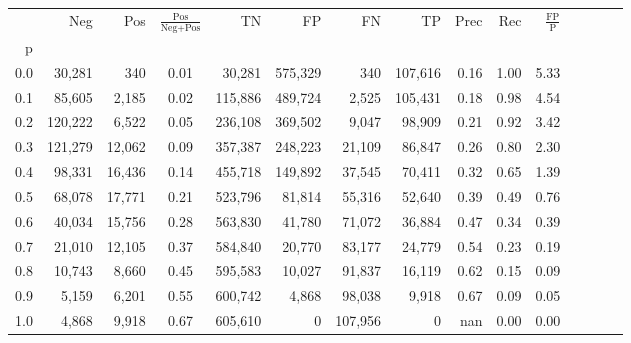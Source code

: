 \begin{tabular}{rrrcrrrrrrrrrrr}
\toprule
{} &      Neg &     Pos & $\frac{\text{Pos}}{\text{Neg}+\text{Pos}}$ &       TN &       FP &       FN &       TP &  Prec &   Rec & $\frac{\text{FP}}{\text{P}}$ \\
p   &          &         &                                            &          &          &          &          &       &       &                              \\
\midrule
0.0 &   30,281 &     340 &                                       0.01 &   30,281 &  575,329 &      340 &  107,616 &  0.16 &  1.00 &                         5.33 \\
0.1 &   85,605 &   2,185 &                                       0.02 &  115,886 &  489,724 &    2,525 &  105,431 &  0.18 &  0.98 &                         4.54 \\
0.2 &  120,222 &   6,522 &                                       0.05 &  236,108 &  369,502 &    9,047 &   98,909 &  0.21 &  0.92 &                         3.42 \\
0.3 &  121,279 &  12,062 &                                       0.09 &  357,387 &  248,223 &   21,109 &   86,847 &  0.26 &  0.80 &                         2.30 \\
0.4 &   98,331 &  16,436 &                                       0.14 &  455,718 &  149,892 &   37,545 &   70,411 &  0.32 &  0.65 &                         1.39 \\
0.5 &   68,078 &  17,771 &                                       0.21 &  523,796 &   81,814 &   55,316 &   52,640 &  0.39 &  0.49 &                         0.76 \\
0.6 &   40,034 &  15,756 &                                       0.28 &  563,830 &   41,780 &   71,072 &   36,884 &  0.47 &  0.34 &                         0.39 \\
0.7 &   21,010 &  12,105 &                                       0.37 &  584,840 &   20,770 &   83,177 &   24,779 &  0.54 &  0.23 &                         0.19 \\
0.8 &   10,743 &   8,660 &                                       0.45 &  595,583 &   10,027 &   91,837 &   16,119 &  0.62 &  0.15 &                         0.09 \\
0.9 &    5,159 &   6,201 &                                       0.55 &  600,742 &    4,868 &   98,038 &    9,918 &  0.67 &  0.09 &                         0.05 \\
1.0 &    4,868 &   9,918 &                                       0.67 &  605,610 &        0 &  107,956 &        0 &   nan &  0.00 &                         0.00 \\
\bottomrule
\end{tabular}
